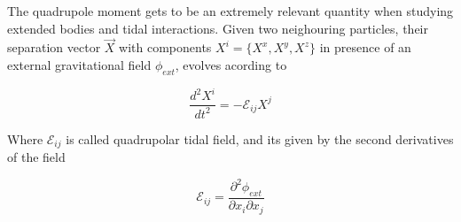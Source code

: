 %
%
%
%
%
%
%
%
%

The quadrupole moment gets to be an extremely relevant quantity when studying extended bodies and tidal interactions. Given two neighouring particles, their separation vector $\vec{X}$ with components $X^i = \{X^x, X^y, X^z \} $ in presence of an external gravitational field $\phi_{ext}$, evolves acording to 


\begin{equation}\label{tidal0}
\frac{d^2 X^{i}}{dt^2} = - \mathcal{E}_{ij} X^{j}
\end{equation} 

Where $\mathcal{E}_{ij}$ is called quadrupolar tidal field, and its given by the second derivatives of the field

\begin{equation}
\mathcal{E}_{ij} = \frac{\partial^2 \phi_{ext}}{\partial x_i \partial x_j}
\end{equation}

